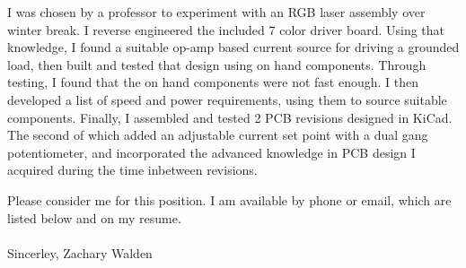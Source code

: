 \documentclass{article}
\begin{document}
\begin{adjustwidth}{70pt}{70pt}
\begin{spacing}{1.25}
I was chosen by a professor to experiment with an RGB laser assembly over winter break. I reverse engineered the included 7 color driver board. Using that knowledge, I found a suitable op-amp based current source for driving a grounded load, then built and tested that design using on hand components. Through testing, I found that the on hand components were not fast enough. I then developed a list of speed and power requirements, using them to source suitable components. Finally, I assembled and tested 2 PCB revisions designed in KiCad. The second of which added an adjustable current set point with a dual gang potentiometer, and incorporated the advanced knowledge in PCB design I acquired during the time inbetween revisions.

Please consider me for this position.
I am available by phone or email, which are listed below and on my resume.\\ \\
Sincerley, Zachary Walden

\vspace*{\fill}
\end{spacing}
\end{adjustwidth}

\newpage
\end{document}
